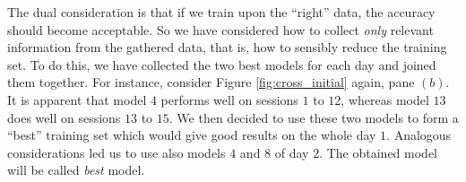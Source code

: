 


The dual consideration is that if we train upon the ``right'' data,
the accuracy should become acceptable. So we have considered how to
collect \emph{only} relevant information from the gathered data, that
is, how to sensibly reduce the training set. To do this, we have
collected the two best models for each day and joined them
together. For instance, consider Figure \ref{fig:cross_initial} again,
pane $(b)$. It is apparent that model $4$ performs well on sessions
$1$ to $12$, whereas model $13$ does well on sessions $13$ to $15$. We
then decided to use these two models to form a ``best'' training set
which would give good results on the whole day $1$. Analogous
considerations led us to use also models $4$ and $8$ of day $2$. The
obtained model will be called \emph{best} model.

